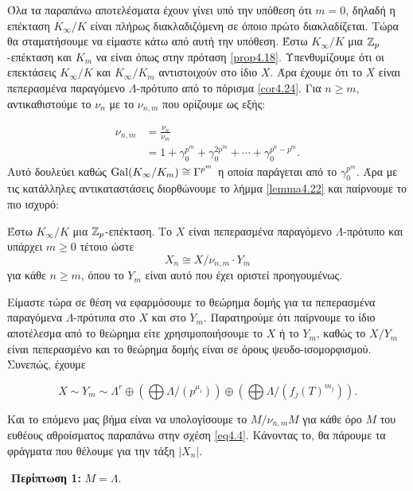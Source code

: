 \noindent Όλα τα παραπάνω αποτελέσματα έχουν γίνει υπό την υπόθεση ότι $m=0$, δηλαδή η επέκταση $K_\infty/K$ είναι πλήρως διακλαδιζόμενη σε όποιο πρώτο διακλαδίζεται. Τώρα θα σταματήσουμε να είμαστε κάτω από αυτή την υπόθεση. Έστω $K_\infty/K$ μια $\mathbb{Z}_p$-επέκταση και $K_m$ να είναι όπως στην πρόταση \ref{prop4.18}. Υπενθυμίζουμε ότι οι επεκτάσεις $K_\infty/K$ και $K_\infty/K_m$ αντιστοιχούν στο ίδιο $X$. Άρα έχουμε ότι το $X$ είναι πεπερασμένα παραγόμενο $\Lambda$-πρότυπο από το πόρισμα \ref{cor4.24}. Για $n\geq m$, αντικαθιστούμε το $\nu_n$ με το $\nu_{n,m}$ που ορίζουμε ως εξής:

\begin{align*} 
    \nu_{n,m} &= \frac{\nu_n}{\nu_m} \\
    &= 1+\gamma_0^{p^m} + \gamma_0^{2p^m} + \cdots + \gamma_0^{p^n - p^m}.
\end{align*} Αυτό δουλεύει καθώς $\operatorname{Gal}(K_\infty/K_m) \cong \Gamma^{p^m}$ η οποία παράγεται από το $\gamma_0^{p^m}$. Άρα με τις κατάλληλες αντικαταστάσεις διορθώνουμε το λήμμα \ref{lemma4.22} και παίρνουμε το πιο ισχυρό:

\begin{lemma} Έστω $K_\infty/K$ μια $\mathbb{Z}_p$-επέκταση. Το $X$ είναι πεπερασμένα παραγόμενο $\Lambda$-πρότυπο και υπάρχει $m\geq 0$ τέτοιο ώστε
    $$X_n \cong X/\nu_{n,m} \cdot Y_m$$ για κάθε $n\geq m$, όπου το $Y_m$ είναι αυτό που έχει οριστεί προηγουμένως.
\end{lemma}


\noindent Είμαστε τώρα σε θέση να εφαρμόσουμε το θεώρημα δομής για τα πεπερασμένα παραγόμενα $\Lambda$-πρότυπα στο $X$ και στο $Y_m$. Παρατηρούμε ότι παίρνουμε το ίδιο αποτέλεσμα από το θεώρημα είτε χρησιμοποιήσουμε το $X$ ή το $Y_m$, καθώς το $X/Y_m$ είναι πεπερασμένο και το θεώρημα δομής είναι σε όρους ψευδο-ισομορφισμού. Συνεπώς, έχουμε

    \begin{equation}\label{eq4.4}
    X \sim Y_m \sim \Lambda^r \oplus \left( \bigoplus \Lambda/(p^{\mu_i})\right) \oplus \left(\bigoplus \Lambda/(f_j(T)^{m_j})\right).
\end{equation}

\noindent Και το επόμενο μας βήμα είναι να υπολογίσουμε το $M/\nu_{n,m}M$ για κάθε όρο $M$ του ευθέους αθροίσματος παραπάνω στην σχέση \ref{eq4.4}. Κάνοντας το, θα πάρουμε τα φράγματα που θέλουμε για την τάξη $|X_n|$.


$ $\newline
\textbf{Περίπτωση 1:} $M = \Lambda$.


